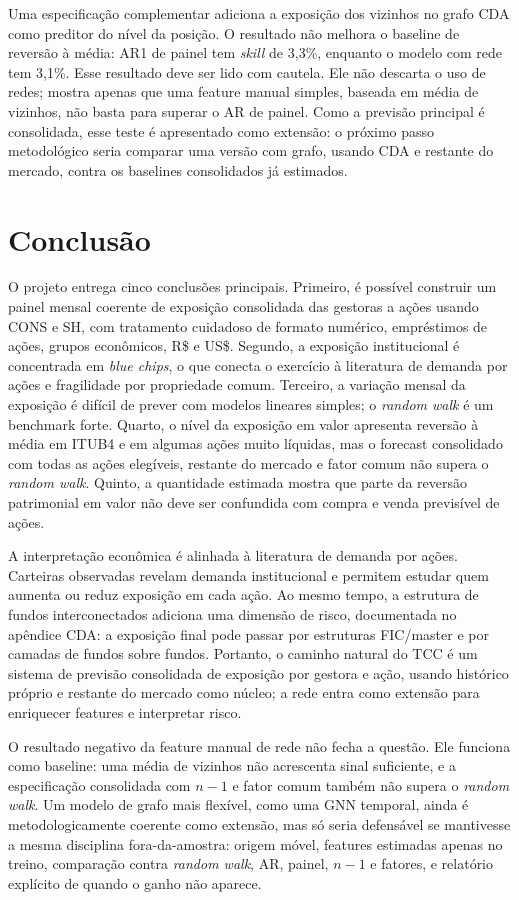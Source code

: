 \documentclass[12pt,a4paper]{report}
\begin{document}
Uma especificação complementar adiciona a exposição dos vizinhos no grafo CDA como preditor do nível da
posição. O resultado não melhora o baseline de reversão à média: AR1 de painel tem \emph{skill} de 3,3\%,
enquanto o modelo com rede tem 3,1\%. Esse resultado deve ser lido com cautela. Ele não descarta o uso de
redes; mostra apenas que uma feature manual simples, baseada em média de vizinhos, não basta para superar o
AR de painel. Como a previsão principal é consolidada, esse teste é apresentado como extensão: o próximo
passo metodológico seria comparar uma versão com grafo, usando CDA e restante do mercado, contra os baselines
consolidados já estimados.

\chapter{Conclusão}

O projeto entrega cinco conclusões principais. Primeiro, é possível construir um painel mensal coerente de
exposição consolidada das gestoras a ações usando CONS e SH, com tratamento cuidadoso de formato numérico,
empréstimos de ações, grupos econômicos, R\$ e US\$. Segundo, a exposição institucional é concentrada em
\emph{blue chips}, o que conecta o exercício à literatura de demanda por ações e fragilidade por propriedade
comum. Terceiro, a variação mensal da exposição é difícil de prever com modelos lineares simples; o
\emph{random walk} é um benchmark forte. Quarto, o nível da exposição em valor apresenta reversão à média em
ITUB4 e em algumas ações muito líquidas, mas o forecast consolidado com todas as ações elegíveis, restante do
mercado e fator comum não supera o \emph{random walk}. Quinto, a quantidade estimada mostra que parte da
reversão patrimonial em valor não deve ser confundida com compra e venda previsível de ações.

A interpretação econômica é alinhada à literatura de demanda por ações. Carteiras observadas revelam demanda
institucional e permitem estudar quem aumenta ou reduz exposição em cada ação. Ao mesmo tempo, a estrutura de
fundos interconectados adiciona uma dimensão de risco, documentada no apêndice CDA: a exposição final pode
passar por estruturas FIC/master e por camadas de fundos sobre fundos. Portanto, o caminho natural do TCC é
um sistema de previsão consolidada de exposição por gestora e ação, usando histórico próprio e restante do
mercado como núcleo; a rede entra como extensão para enriquecer features e interpretar risco.

O resultado negativo da feature manual de rede não fecha a questão. Ele funciona como baseline: uma média de
vizinhos não acrescenta sinal suficiente, e a especificação consolidada com $n-1$ e fator comum também não
supera o \emph{random walk}. Um modelo de grafo mais flexível, como uma GNN temporal, ainda é
metodologicamente coerente como extensão, mas só seria defensável se mantivesse a mesma disciplina
fora-da-amostra: origem móvel, features estimadas apenas no treino, comparação contra \emph{random walk},
AR, painel, $n-1$ e fatores, e relatório explícito de quando o ganho não aparece.
\end{document}
